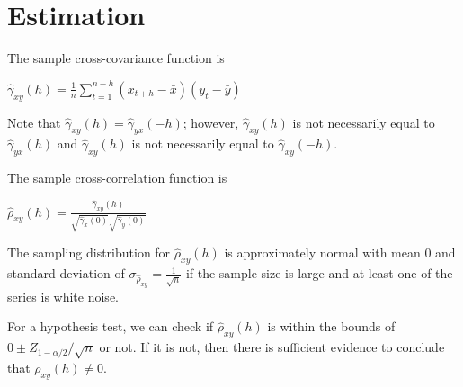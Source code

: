 \documentclass[
]{book}
\theoremstyle{definition}
\theoremstyle{definition}
\theoremstyle{definition}
\theoremstyle{definition}
\theoremstyle{remark}
\begin{document}
\hypertarget{estimation-1}{%
\section{Estimation}\label{estimation-1}}

The sample cross-covariance function is

\(\hat \gamma_{xy}(h)=\frac1n\sum_{t=1}^{n-h}(x_{t+h}-\bar x)(y_t-\bar y)\)

Note that \(\hat \gamma_{xy}(h)=\hat \gamma_{yx}(-h)\); however, \(\hat \gamma_{xy}(h)\) is not necessarily equal to \(\hat \gamma_{yx}(h)\) and \(\hat \gamma_{xy}(h)\) is not necessarily equal to \(\hat \gamma_{xy}(-h)\).

The sample cross-correlation function is

\(\hat \rho_{xy}(h)=\frac{\hat \gamma_{xy}(h)}{\sqrt{\hat \gamma_x(0)}\sqrt{\hat \gamma_y(0)}}\)

The sampling distribution for \(\hat \rho_{xy}(h)\) is approximately normal with mean 0 and standard deviation of \(\sigma_{\hat \rho_{xy}}=\frac{1}{\sqrt{n}}\) if the sample size is large and at least one of the series is white noise.

For a hypothesis test, we can check if \(\hat \rho_{xy}(h)\) is within the bounds of \(0\pm Z_{1-\alpha/2}/\sqrt{n}\) or not. If it is not, then there is sufficient evidence to conclude that \(\rho_{xy}(h) \ne 0\).
\end{document}
